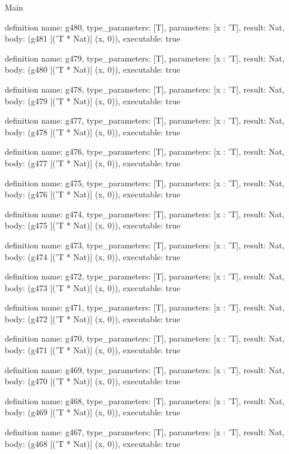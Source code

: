 \begin{lexlean}{Main}
\begin{semanticmodule}
definition{
  name: g480,
  type_parameters: [T],
  parameters: [x : 'T],
  result: Nat,
  body: (g481 [('T * Nat)] (x, 0)),
  executable: true
}

definition{
  name: g479,
  type_parameters: [T],
  parameters: [x : 'T],
  result: Nat,
  body: (g480 [('T * Nat)] (x, 0)),
  executable: true
}

definition{
  name: g478,
  type_parameters: [T],
  parameters: [x : 'T],
  result: Nat,
  body: (g479 [('T * Nat)] (x, 0)),
  executable: true
}

definition{
  name: g477,
  type_parameters: [T],
  parameters: [x : 'T],
  result: Nat,
  body: (g478 [('T * Nat)] (x, 0)),
  executable: true
}

definition{
  name: g476,
  type_parameters: [T],
  parameters: [x : 'T],
  result: Nat,
  body: (g477 [('T * Nat)] (x, 0)),
  executable: true
}

definition{
  name: g475,
  type_parameters: [T],
  parameters: [x : 'T],
  result: Nat,
  body: (g476 [('T * Nat)] (x, 0)),
  executable: true
}

definition{
  name: g474,
  type_parameters: [T],
  parameters: [x : 'T],
  result: Nat,
  body: (g475 [('T * Nat)] (x, 0)),
  executable: true
}

definition{
  name: g473,
  type_parameters: [T],
  parameters: [x : 'T],
  result: Nat,
  body: (g474 [('T * Nat)] (x, 0)),
  executable: true
}

definition{
  name: g472,
  type_parameters: [T],
  parameters: [x : 'T],
  result: Nat,
  body: (g473 [('T * Nat)] (x, 0)),
  executable: true
}

definition{
  name: g471,
  type_parameters: [T],
  parameters: [x : 'T],
  result: Nat,
  body: (g472 [('T * Nat)] (x, 0)),
  executable: true
}

definition{
  name: g470,
  type_parameters: [T],
  parameters: [x : 'T],
  result: Nat,
  body: (g471 [('T * Nat)] (x, 0)),
  executable: true
}

definition{
  name: g469,
  type_parameters: [T],
  parameters: [x : 'T],
  result: Nat,
  body: (g470 [('T * Nat)] (x, 0)),
  executable: true
}

definition{
  name: g468,
  type_parameters: [T],
  parameters: [x : 'T],
  result: Nat,
  body: (g469 [('T * Nat)] (x, 0)),
  executable: true
}

definition{
  name: g467,
  type_parameters: [T],
  parameters: [x : 'T],
  result: Nat,
  body: (g468 [('T * Nat)] (x, 0)),
  executable: true
}


\end{semanticmodule}
\end{lexlean}

